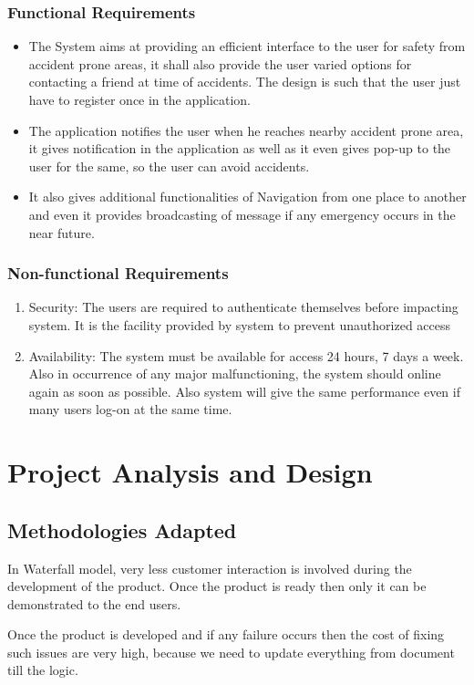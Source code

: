 \documentclass{article}
\begin{document}
\begin{flushleft}
            \subsubsection{Functional Requirements}
            \begin{itemize}
                \item The System aims at providing an efficient interface to the user for safety from accident prone areas, it shall also provide the user varied options for contacting a friend at time of accidents. The design is such that the user just have to register once in the application.
                \item The application notifies the user when he reaches nearby accident prone area, it gives notification in the application as well as it even gives pop-up to the user for the same, so the user can avoid accidents.
                \item It also gives additional functionalities of Navigation from one place to another and even it provides broadcasting of message if any emergency occurs in the near future.
            \end{itemize}
            \subsubsection{Non-functional Requirements}
            \begin{enumerate}
                \item Security: The users are required to authenticate themselves before impacting system. It is the facility provided by system to prevent unauthorized access
                \item Availability: The system must be available for access 24 hours, 7 days a week. Also in occurrence of any major malfunctioning, the system should online again as soon as possible. Also system will give the same performance even if many users log-on at the same time.
            \end{enumerate}
            \newpage
            
    \section{Project Analysis and Design}
        \subsection{Methodologies Adapted}
            In Waterfall model, very less customer interaction is involved during the development of the product. Once the product is ready then only it can be demonstrated to the end users.
            \par
            Once the product is developed and if any failure occurs then the cost of fixing such issues are very high, because we need to update everything from document till the logic.
        

\end{flushleft}
\end{document}
